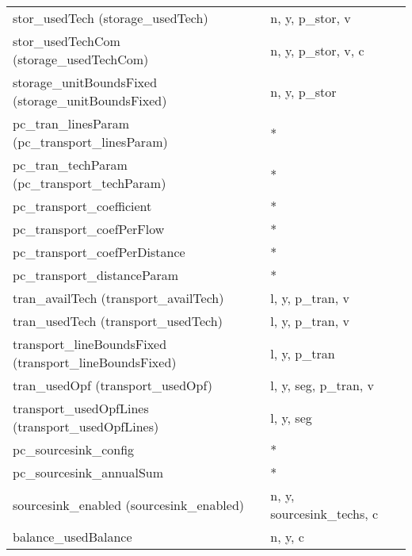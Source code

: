 \documentclass[11pt]{article}
\begin{document}
\begin{tabularx}{\textwidth}{| l | l | X |}
stor\_usedTech (storage\_usedTech)  & n, y, p\_stor, v &  \\ 
stor\_usedTechCom (storage\_usedTechCom)  & n, y, p\_stor, v, c &  \\ 
storage\_unitBoundsFixed (storage\_unitBoundsFixed)  & n, y, p\_stor &  \\ 
pc_tran_linesParam (pc\_transport\_linesParam)  & * &  \\ 
pc_tran_techParam (pc\_transport\_techParam)  & * &  \\ 
pc\_transport\_coefficient & * &  \\ 
pc\_transport\_coefPerFlow & * &  \\ 
pc\_transport\_coefPerDistance & * &  \\ 
pc\_transport\_distanceParam & * &  \\ 
tran\_availTech (transport\_availTech)  & l, y, p\_tran, v &  \\ 
tran\_usedTech (transport\_usedTech)  & l, y, p\_tran, v &  \\ 
transport\_lineBoundsFixed (transport\_lineBoundsFixed)  & l, y, p\_tran &  \\ 
tran\_usedOpf (transport\_usedOpf)  & l, y, seg, p\_tran, v &  \\ 
transport\_usedOpfLines (transport\_usedOpfLines)  & l, y, seg &  \\ 
pc\_sourcesink\_config & * &  \\ 
pc\_sourcesink\_annualSum & * &  \\ 
sourcesink\_enabled (sourcesink\_enabled)  & n, y, sourcesink\_techs, c &  \\ 
balance\_usedBalance & n, y, c &  \\ 
\hline 
\end{tabularx}
\end{document}

